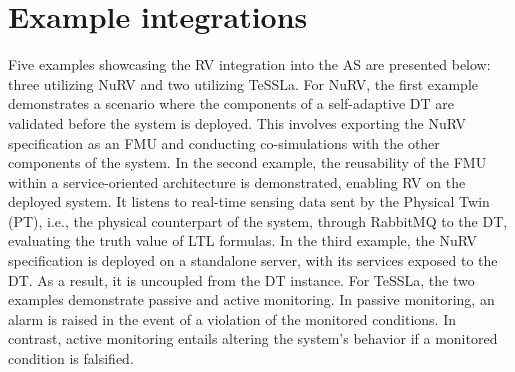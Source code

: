 \section{Example integrations}\label{sec:examples}

Five examples showcasing the RV integration into the AS are presented below: three utilizing NuRV and two utilizing TeSSLa.
For NuRV, the first example demonstrates a scenario where the components of a self-adaptive DT are validated before the system is deployed.
This involves exporting the NuRV specification as an FMU and conducting co-simulations with the other components of the system.
In the second example, the reusability of the FMU within a service-oriented architecture is demonstrated, enabling RV on the deployed system.
It listens to real-time sensing data sent by the Physical Twin (PT), i.e., the physical counterpart of the system, through RabbitMQ to the DT, evaluating the truth value of LTL formulas.
In the third example, the NuRV specification is deployed on a standalone server, with its services exposed to the DT.
As a result, it is uncoupled from the DT instance.
For TeSSLa, the two examples demonstrate passive and active monitoring.
In passive monitoring, an alarm is raised in the event of a violation of the monitored conditions.
In contrast, active monitoring entails altering the system's behavior if a monitored condition is falsified.